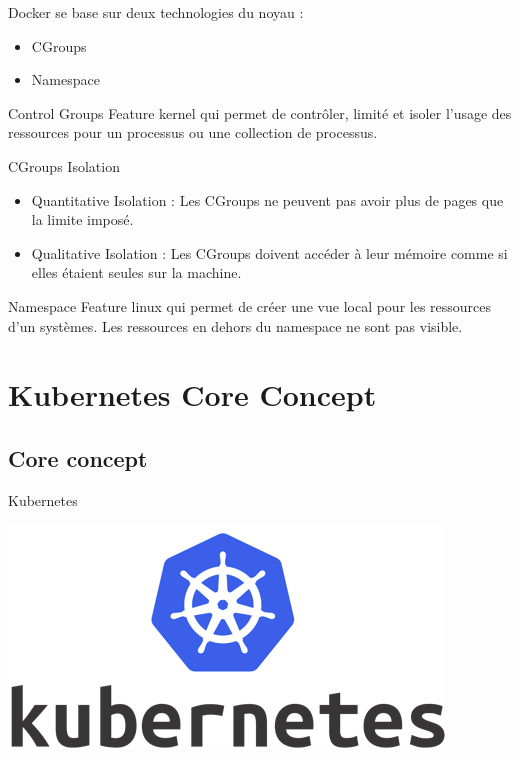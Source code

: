 \documentclass{bredelebeamer}
\begin{document}
\begin{frame}
Docker se base sur deux technologies du noyau : 
\begin{itemize}
\item CGroups
\item Namespace
\end{itemize} \pause

\begin{exampleblock}{Control Groups}
Feature kernel qui permet de contrôler, limité et isoler l'usage des ressources pour un processus ou une collection de processus. 
\end{exampleblock} \pause


\begin{block} {CGroups Isolation}
\begin{itemize}
\item  Quantitative Isolation : Les CGroups ne peuvent pas avoir plus de pages que la limite imposé.
\item Qualitative Isolation : Les CGroups doivent accéder à leur mémoire comme si elles étaient seules sur la machine.
\end{itemize}
\end{block} \pause

\begin{exampleblock}{Namespace}
Feature linux qui permet de créer une vue local pour les ressources d'un systèmes. Les ressources en dehors du namespace ne sont pas visible. 
\end{exampleblock}
\end{frame}


\section{Kubernetes  Core Concept}
\subsection{Core concept}

\begin{frame}{Kubernetes}
\begin{center}
\includegraphics[scale=0.3]{images/img6.png}
\end{center}
\end{frame}
\end{document}
